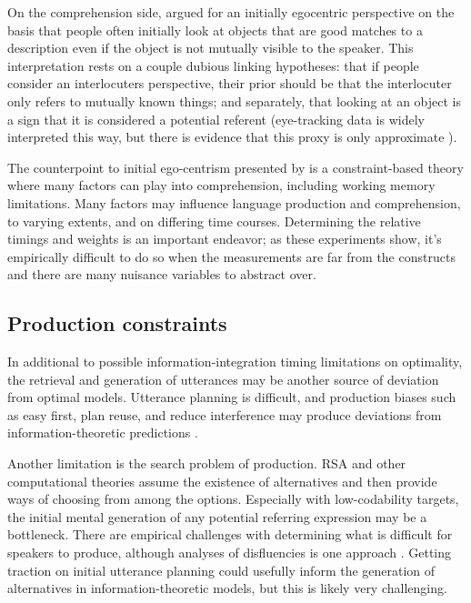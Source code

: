\documentclass[]{article}
\begin{document}
On the comprehension side, \citet{keysar2000} argued for an initially egocentric perspective on the basis that people often initially look at objects that are good matches to a description even if the object is not mutually visible to the speaker. This interpretation rests on a couple dubious linking hypotheses: that if people consider an interlocuters perspective, their prior should be that the interlocuter only refers to mutually known things;  and separately, that looking at an object is a sign that it is considered a potential referent (eye-tracking data is widely interpreted this way, but there is evidence that this proxy is only approximate \citet{degena}).

The counterpoint to initial ego-centrism presented by \citet{hanna2003} is a constraint-based theory where many factors can play into comprehension, including working memory limitations. Many factors may influence language production and comprehension, to varying extents, and on differing time courses. Determining the relative timings and weights is an important endeavor; as these experiments show, it's empirically difficult to do so when the measurements are far from the constructs and there are many nuisance variables to abstract over. %

\subsection{Production constraints}
In additional to possible information-integration timing limitations on optimality, the retrieval and generation of utterances may be another source of deviation from optimal models. Utterance planning is difficult, and production biases such as easy first, plan reuse, and reduce interference may produce deviations from information-theoretic predictions \citep{macdonald2013}.

Another limitation is the search problem of production. RSA and other computational theories assume the existence of alternatives and then provide ways of choosing from among the options. Especially with low-codability targets, the initial mental generation of any potential referring expression may be a bottleneck. There are empirical challenges with determining what is difficult for speakers to produce, although analyses of disfluencies is one approach \citep{yoon2014}.  Getting traction on initial utterance planning could usefully inform the generation of alternatives in information-theoretic models, but this is likely very challenging. 
\end{document}
